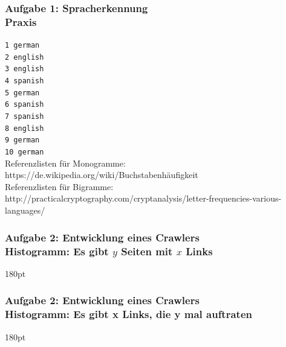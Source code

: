 \documentclass[accentcolor=tud7b,noresetcounter]{tudbeamer}
\begin{document}
  \begin{frame}
	\frametitle{Aufgabe 1: Spracherkennung\\
	Praxis}
	\texttt{1 german\\
	2 english\\
	3 english\\
	4 spanish\\
	5 german\\
	6 spanish\\
	7 spanish\\
	8 english\\
	9 german\\
	10 german\\}
	\vspace{\fill}
	Referenzlisten für Monogramme: {\small https://de.wikipedia.org/wiki/Buchstabenhäufigkeit}\\
	Referenzlisten für Bigramme: {\small http://practicalcryptography.com/cryptanalysis/letter-frequencies-various-languages/}
	
  \end{frame}
  \begin{frame}[t]
  	\frametitle{Aufgabe 2: Entwicklung eines Crawlers\\
	Histogramm: Es gibt $y$ Seiten mit $x$ Links}
	\resizebox {\columnwidth} {180pt} {
	}
  \end{frame}
  
  \begin{frame}[t]
  	\frametitle{Aufgabe 2: Entwicklung eines Crawlers\\
	Histogramm: Es gibt x Links, die y mal auftraten}
	\resizebox {\columnwidth} {180pt} {
	}
  \end{frame}
  
\end{document}

